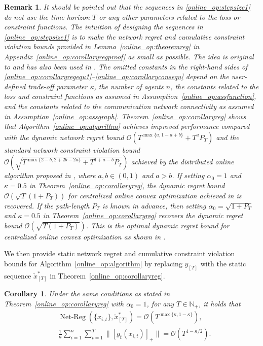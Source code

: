 \documentclass[12pt,draftcls,onecolumn]{IEEEtran}%
\newtheorem{remark}{Remark}
\newtheorem{corollary}{Corollary}
\DeclareMathOperator{\NetReg}{Net-Reg}
\begin{document}
\begin{remark}\label{online_op:remark_dynamic}
	It should be pointed out that the sequences in \eqref{online_op:stepsize1} do not use the time horizon $T$ or any other parameters related to the loss or constraint functions. The intuition of designing the sequences in \eqref{online_op:stepsize1} is to make the network regret and cumulative constraint violation bounds provided in Lemma~\ref{online_op:theoremreg} in  Appendix~\ref{online_op:corollaryregproof} as small as possible. The idea is original to \cite{yi2020distributed} and has also been used in \cite{sharma2020distributed,yi2019distributed}.
	The omitted constants in the right-hand sides of \eqref{online_op:corollaryregequ1}--\eqref{online_op:corollaryconsequ} depend on the user-defined trade-off parameter $\kappa$, the number of agents $n$, the constants related to the loss and constraint functions as assumed in Assumption~\ref{online_op:assfunction}, and the constants related to the communication network connectivity as assumed in Assumption~\ref{online_op:assgraph}. Theorem~\ref{online_op:corollaryreg} shows that Algorithm~\ref{online_op:algorithm} achieves improved performance compared with the dynamic network regret bound $\mathcal{O}(T^{\max\{a,1-a+b\}}+T^aP_T)$ and the standard network constraint violation bound $\mathcal{O}(\sqrt{T^{\max\{2-b,2+2b-2a\}}+T^{1+a-b}P_T})$ achieved by the distributed online algorithm proposed in \cite{sharma2020distributed}, where $a,b\in(0,1)$ and $a>b$.
	If setting $\alpha_0=1$ and  $\kappa=0.5$ in Theorem~\ref{online_op:corollaryreg}, the dynamic regret bound $\mathcal{O}(\sqrt{T}(1+P_T))$ for centralized online convex optimization achieved in \cite{zinkevich2003online} is recovered. If the path-length $P_T$ is known in advance, then setting $\alpha_0=\sqrt{1+P_T}$ and  $\kappa=0.5$ in Theorem~\ref{online_op:corollaryreg} recovers the dynamic regret bound $\mathcal{O}(\sqrt{T(1+P_T)})$. This is the optimal dynamic regret bound for centralized online convex optimization as shown in \cite{zhang2018adaptive,yi2021regret}.
\end{remark}

We then provide static network regret and cumulative constraint violation bounds for Algorithm~\ref{online_op:algorithm} by
replacing $y_{[T]}$ with the static sequence $\check{x}^*_{[T]}$ in Theorem~\ref{online_op:corollaryreg}.
\begin{corollary}\label{online_op:theoremstatic}
	Under the same conditions as stated in Theorem~\ref{online_op:corollaryreg} with $\alpha_0=1$, for any $T\in\mathbb{N}_+$, it holds that
	\begin{align}
		&\NetReg(\{x_{i,t}\},\check{x}^*_{[T]})
		=\mathcal{O}(T^{\max\{\kappa,1-\kappa\}}),\label{online_op:staticregequ1}\\
		&\frac{1}{n}\sum_{i=1}^n\sum_{t=1}^T\|[g_{t}(x_{i,t})]_+\|=
		\mathcal{O}(T^{1-\kappa/2}).
		\label{online_op:staticconsequ}
	\end{align}
\end{corollary}
\end{document}
